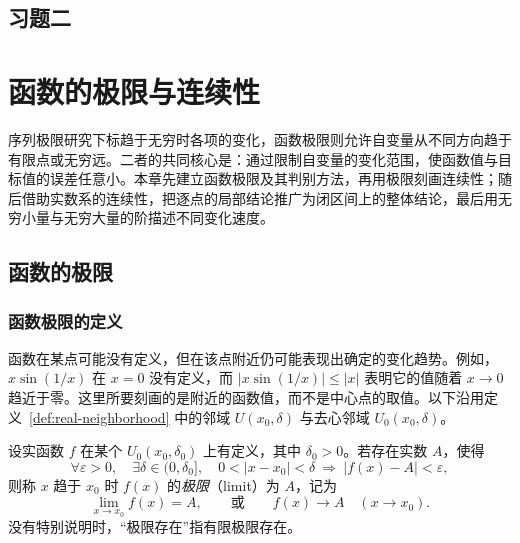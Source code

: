 \documentclass[UTF8,12pt,a4paper,fontset=fandol]{ctexbook}
\begin{document}
\section*{习题二}

\chapter{函数的极限与连续性}
\label{chap:function-limits-and-continuity}

序列极限研究下标趋于无穷时各项的变化，函数极限则允许自变量从不同方向趋于有限点或无穷远。二者的共同核心是：通过限制自变量的变化范围，使函数值与目标值的误差任意小。本章先建立函数极限及其判别方法，再用极限刻画连续性；随后借助实数系的连续性，把逐点的局部结论推广为闭区间上的整体结论，最后用无穷小量与无穷大量的阶描述不同变化速度。

\section{函数的极限}
\label{sec:function-limits}

\subsection{函数极限的定义}
\label{subsec:definition-of-function-limits}

函数在某点可能没有定义，但在该点附近仍可能表现出确定的变化趋势。例如，$x\sin(1/x)$ 在 $x=0$ 没有定义，而 $|x\sin(1/x)|\leq|x|$ 表明它的值随着 $x\to0$ 趋近于零。这里所要刻画的是附近的函数值，而不是中心点的取值。以下沿用定义~\ref{def:real-neighborhood} 中的邻域 $U(x_0,\delta)$ 与去心邻域 $U_0(x_0,\delta)$。

\begin{definition}
\label{def:finite-function-limit}
设实函数 $f$ 在某个 $U_0(x_0,\delta_0)$ 上有定义，其中 $\delta_0>0$。若存在实数 $A$，使得
\begin{equation}
    \forall\varepsilon>0,\quad\exists\delta\in(0,\delta_0],\quad
    0<|x-x_0|<\delta\ \Longrightarrow\ |f(x)-A|<\varepsilon,
    \label{eq:epsilon-delta-function-limit}
\end{equation}
则称 $x$ 趋于 $x_0$ 时 $f(x)$ 的\emph{极限}（limit）为 $A$，记为
\[
    \lim_{x\to x_0}f(x)=A,
    \qquad\text{或}\qquad f(x)\to A\quad(x\to x_0).
\]
没有特别说明时，“极限存在”指有限极限存在。
\end{definition}
\end{document}
